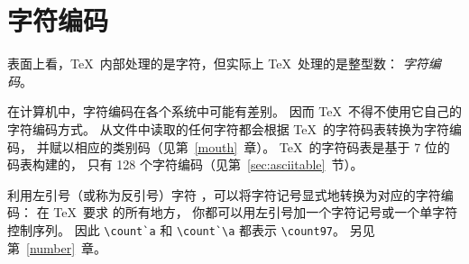 \documentclass{book}
\begin{document}
\section{字符编码}
\label{char:code}

表面上看，\TeX\ 内部处理的是字符，但实际上 \TeX\ 处理的是整型数：
\emph{字符编码}。

在计算机中，字符编码在各个系统中可能有差别。
因而 \TeX\ 不得不使用它自己的字符编码方式。
从文件中读取的任何字符都会根据 \TeX\ 的字符码表转换为字符编码，
并赋以相应的类别码（见第~\ref{mouth}~章）。
\TeX\ 的字符码表是基于 7 位的 \ascii{} 码表构建的，
只有 128 个字符编码（见第~\ref{sec:asciitable}~节）。

利用左引号（或称为反引号）字符 ，可以将字符记号显式地转换为对应的字符编码：
在 \TeX\ 要求  的所有地方，
你都可以用左引号加一个字符记号或一个单字符控制序列。
因此 \verb.\count`a. 和 \verb.\count`\a. 都表示 \verb.\count97.。
另见第~\ref{number}~章。
\end{document}
